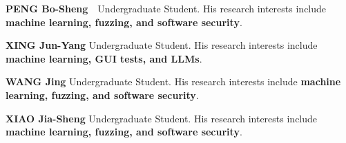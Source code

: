 \documentclass[10.5pt,compsoc]{CjC}
\theoremstyle{mystyle}
\begin{document}
\clearpage\clearpage

\begin{strip}
\end{strip}

\begin{biography}
\noindent
\textbf{PENG Bo-Sheng}\ \ Undergraduate Student. His research interests include \textbf{machine learning, fuzzing, and software security}.
\end{biography}

\vspace{10mm}
\begin{biography}
\noindent
\textbf{XING Jun-Yang} Undergraduate Student. His research interests include \textbf{machine learning, GUI tests, and LLMs}.
\end{biography}
\vspace{10mm}

\begin{biography}
  \noindent
  \textbf{WANG Jing} Undergraduate Student. His research interests include \textbf{machine learning, fuzzing, and software security}.
\end{biography}

\vspace{10mm}
\begin{biography}
\noindent
\textbf{XIAO Jia-Sheng} Undergraduate Student. His research interests include \textbf{machine learning, fuzzing, and software security}.
\end{biography}
\vspace{10mm}
 
\end{document}
